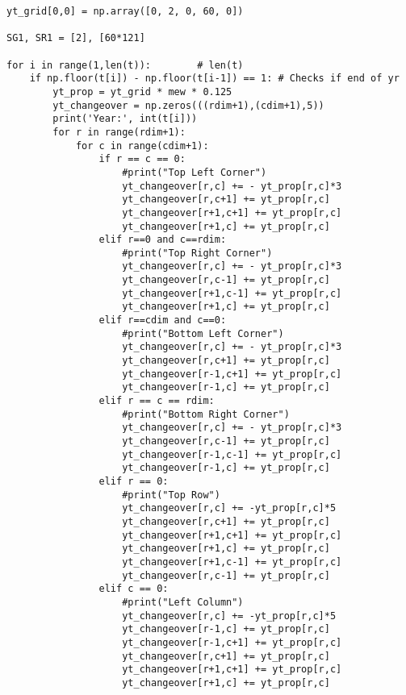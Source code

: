 \documentclass{article}
\begin{document}
\begin{verbatim}
yt_grid[0,0] = np.array([0, 2, 0, 60, 0])

SG1, SR1 = [2], [60*121]

for i in range(1,len(t)):        # len(t)
    if np.floor(t[i]) - np.floor(t[i-1]) == 1: # Checks if end of yr
        yt_prop = yt_grid * mew * 0.125
        yt_changeover = np.zeros(((rdim+1),(cdim+1),5))
        print('Year:', int(t[i]))
        for r in range(rdim+1):
            for c in range(cdim+1):
                if r == c == 0:
                    #print("Top Left Corner")
                    yt_changeover[r,c] += - yt_prop[r,c]*3
                    yt_changeover[r,c+1] += yt_prop[r,c]
                    yt_changeover[r+1,c+1] += yt_prop[r,c]
                    yt_changeover[r+1,c] += yt_prop[r,c] 
                elif r==0 and c==rdim:
                    #print("Top Right Corner")
                    yt_changeover[r,c] += - yt_prop[r,c]*3
                    yt_changeover[r,c-1] += yt_prop[r,c]
                    yt_changeover[r+1,c-1] += yt_prop[r,c]
                    yt_changeover[r+1,c] += yt_prop[r,c]                 
                elif r==cdim and c==0:
                    #print("Bottom Left Corner")
                    yt_changeover[r,c] += - yt_prop[r,c]*3
                    yt_changeover[r,c+1] += yt_prop[r,c]
                    yt_changeover[r-1,c+1] += yt_prop[r,c]
                    yt_changeover[r-1,c] += yt_prop[r,c]                  
                elif r == c == rdim:
                    #print("Bottom Right Corner")
                    yt_changeover[r,c] += - yt_prop[r,c]*3
                    yt_changeover[r,c-1] += yt_prop[r,c]
                    yt_changeover[r-1,c-1] += yt_prop[r,c]
                    yt_changeover[r-1,c] += yt_prop[r,c]                    
                elif r == 0:
                    #print("Top Row")
                    yt_changeover[r,c] += -yt_prop[r,c]*5
                    yt_changeover[r,c+1] += yt_prop[r,c]
                    yt_changeover[r+1,c+1] += yt_prop[r,c]
                    yt_changeover[r+1,c] += yt_prop[r,c]
                    yt_changeover[r+1,c-1] += yt_prop[r,c]
                    yt_changeover[r,c-1] += yt_prop[r,c]
                elif c == 0:
                    #print("Left Column")
                    yt_changeover[r,c] += -yt_prop[r,c]*5
                    yt_changeover[r-1,c] += yt_prop[r,c]
                    yt_changeover[r-1,c+1] += yt_prop[r,c]
                    yt_changeover[r,c+1] += yt_prop[r,c]
                    yt_changeover[r+1,c+1] += yt_prop[r,c]
                    yt_changeover[r+1,c] += yt_prop[r,c]                    

\end{verbatim}
\end{document}
